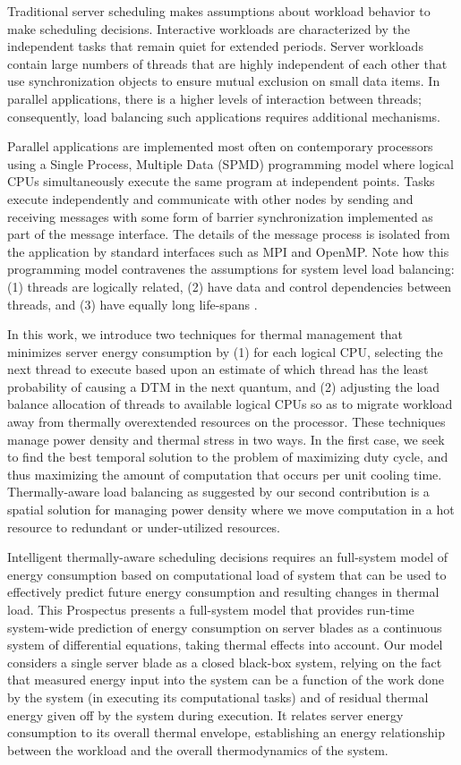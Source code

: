 Traditional server scheduling makes assumptions about workload
behavior to make scheduling decisions.  Interactive workloads are
characterized by the independent tasks that remain quiet for extended
periods.  Server workloads contain large numbers of threads that are
highly independent of each other that use synchronization objects to
ensure mutual exclusion on small data items.  In parallel applications,
there is a higher levels of interaction between threads; consequently,
load balancing such applications requires additional mechanisms.  

Parallel applications are implemented most often on contemporary
processors using a Single Process, Multiple Data (SPMD) programming
model where logical CPUs simultaneously execute the same program at
independent points.  Tasks execute independently and communicate with
other nodes by sending and receiving messages with some form of barrier
synchronization implemented as part of the message interface.  The
details of the message process is isolated from the application by
standard interfaces such as MPI and OpenMP.  Note how this programming
model contravenes the assumptions for system level load balancing: (1)
threads are logically related, (2) have data and control dependencies
between threads, and (3) have equally long life-spans
\cite{Hofmeyr2010}.

In this work, we introduce two techniques for thermal management that
minimizes server energy consumption by (1) for each logical CPU,
selecting the next thread to execute based upon an estimate of which
thread has the least probability of causing a DTM in the next quantum,
and (2) adjusting the load balance allocation of threads to available
logical CPUs so as to migrate workload away from thermally overextended
resources on the processor.  These techniques manage power density and
thermal stress in two ways. In the
first case, we seek to find the best temporal solution to the problem of
maximizing duty cycle, and thus maximizing the amount of computation
that occurs per unit cooling time.  Thermally-aware load balancing as
suggested by our second contribution is a spatial solution for managing
power density where we move computation in a hot resource to redundant or
under-utilized resources.

Intelligent thermally-aware scheduling decisions requires an full-system
model of energy consumption based on computational load of system that
can be used to effectively predict future energy consumption and
resulting changes in thermal load.  This Prospectus presents a
full-system model that provides run-time system-wide prediction of
energy consumption on server blades as a continuous system of
differential equations, taking thermal effects into account.  Our model
considers a single server blade as a closed black-box system, relying on
the fact that measured energy input into the system can be a function of
the work done by the system (in executing its computational tasks) and
of residual thermal energy given off by the system during execution.  It
relates server energy consumption to its overall thermal envelope,
establishing an energy relationship between the workload and the overall
thermodynamics of the system.

